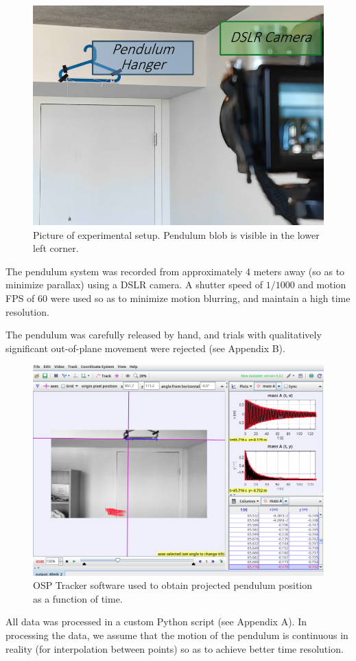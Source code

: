 \documentclass[prl,twocolumn,amsmath,amssymb,superscriptaddress]{revtex4-2}
\begin{document}
\begin{figure}[htb]
    \includegraphics[width=0.68\linewidth]{setup.png}
    \caption{Picture of experimental setup. Pendulum blob is visible in the lower left corner.}
    \label{fig:experiment_setup}
\end{figure}

\newpage

The pendulum system was recorded from approximately 4 meters away (so as to minimize parallax) using a DSLR camera. A shutter speed of $1/1000$ and motion FPS of $60$ were used so as to minimize motion blurring, and maintain a high time resolution.

The pendulum was carefully released by hand, and trials with qualitatively significant out-of-plane movement were rejected (see Appendix B).



\begin{figure}[htb]
    \includegraphics[width=0.7\linewidth]{tracker.png}
    \caption{OSP Tracker software used to obtain projected pendulum position as a function of time.}
    \label{fig:tracker}
\end{figure}

All data was processed in a custom Python script (see Appendix A). In processing the data, we assume that the motion of the pendulum is continuous in reality (for interpolation between points) so as to achieve better time resolution.
\end{document}
